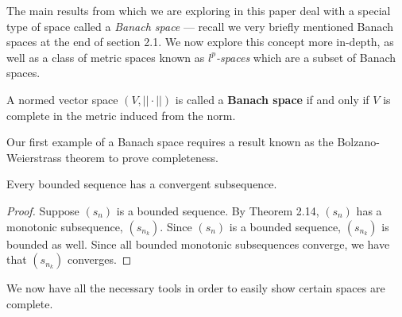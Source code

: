 The main results from \cite{main} which we are exploring in this paper deal with a special type of space called a \textit{Banach space} --- recall we very briefly mentioned Banach spaces at the end of section 2.1.  We now explore this concept more in-depth, as well as a class of metric spaces known as \textit{$l^p$-spaces} which are a subset of Banach spaces.

\begin{defn}
A normed vector space $(V, ||\cdot||)$ is called a \textbf{Banach space} if and only if $V$ is complete in the metric induced from the norm.
\end{defn}

Our first example of a Banach space requires a result known as the Bolzano-Weierstrass theorem to prove completeness.

\begin{theorem}
Every bounded sequence has a convergent subsequence.
\end{theorem}

\begin{proof}
Suppose $(s_n)$ is a bounded sequence.  By Theorem 2.14, $(s_n)$ has a monotonic subsequence, $(s_{n_k})$.  Since $(s_n)$ is a bounded sequence, $(s_{n_k})$ is bounded as well.  Since all bounded monotonic subsequences converge, we have that $(s_{n_k})$ converges.
\end{proof}

We now have all the necessary tools in order to easily show certain spaces are complete.

